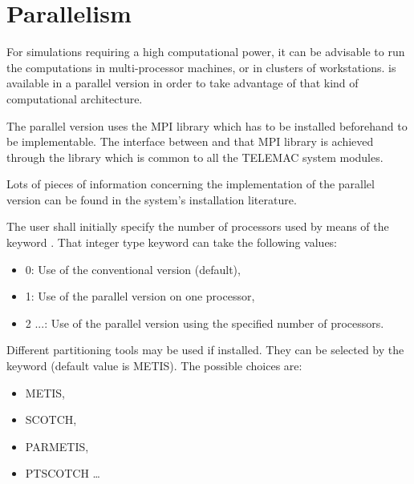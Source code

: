 \chapter{Parallelism}

For simulations requiring a high computational power, it can be advisable to
run the computations in multi-processor machines, or in clusters of
workstations.  is available in a parallel version in order to take
advantage of that kind of computational architecture.

The  parallel version uses the MPI library which has to be installed
beforehand to be implementable. The interface between  and that MPI
library is achieved through the  library which is common to all
the TELEMAC system modules.

Lots of pieces of information concerning the implementation of the parallel
version can be found in the system's installation literature.

The user shall initially specify the number of processors used by means of the
keyword . That integer type keyword can take the
following values:

\begin{itemize}
\item  0: Use of the conventional  version (default),

\item  1: Use of the parallel  version on one processor,

\item  2 ...: Use of the parallel  version using the
specified number of processors.
\end{itemize}

Different partitioning tools may be used if installed.
They can be selected by the keyword  (default value
is METIS). The possible choices are:
\begin{itemize}
\item METIS,
\item SCOTCH,
\item PARMETIS,
\item PTSCOTCH \ldots
\end{itemize}
